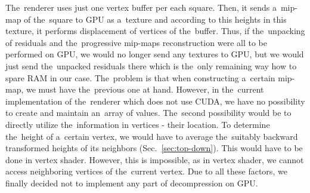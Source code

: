 The~renderer uses just one vertex buffer per each square. Then, it sends a~mip-map of the~square to GPU as a~texture and according to this heights in this texture, it performs displacement of vertices of the~buffer. Thus, if the~unpacking of residuals and the~progressive mip-maps reconstruction were all to be performed on GPU, we would no longer send any textures to GPU, but we would just send the~unpacked residuals there which is the~only remaining way how to spare RAM in our case. The~problem is that when constructing a~certain mip-map, we must have the~previous one at hand. However, in the~current implementation of the~renderer which does not use CUDA, we have no possibility to create and maintain an~array of values. The~second possibility would be to directly utilize the~information in vertices - their location. To determine the~height of a~certain vertex, we would have to average the~suitably backward transformed heights of its neighbors (Sec.~\ref{sec:top-down}). This would have to be done in vertex shader. However, this is impossible, as in vertex shader, we cannot access neighboring vertices of the~current vertex. Due to all these factors, we finally decided not to implement any part of decompression on GPU.